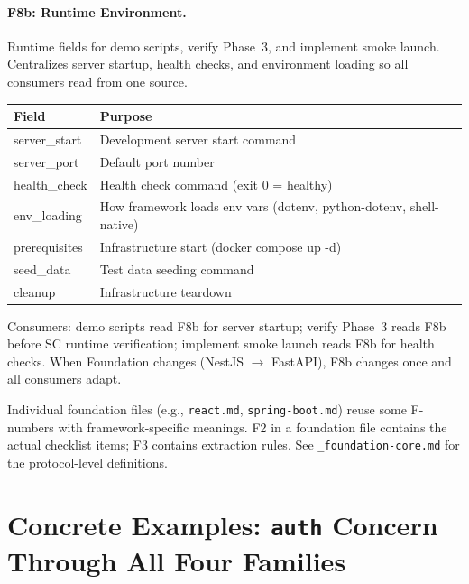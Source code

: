 \documentclass[11pt,a4paper,openright,twoside]{report}
\begin{document}
\paragraph{F8b: Runtime Environment.}
Runtime fields for demo scripts, verify Phase~3, and implement smoke launch. Centralizes server startup, health checks, and environment loading so all consumers read from one source.

\begin{table}[H]
\centering
\begin{tabularx}{\textwidth}{lX}
\toprule
\textbf{Field} & \textbf{Purpose} \\
\midrule
server\_start & Development server start command \\
server\_port & Default port number \\
health\_check & Health check command (exit 0 = healthy) \\
env\_loading & How framework loads env vars (dotenv, python-dotenv, shell-native) \\
prerequisites & Infrastructure start (docker compose up -d) \\
seed\_data & Test data seeding command \\
cleanup & Infrastructure teardown \\
\bottomrule
\end{tabularx}
\end{table}

Consumers: demo scripts read F8b for server startup; verify Phase~3 reads F8b before SC runtime verification; implement smoke launch reads F8b for health checks. When Foundation changes (NestJS $\rightarrow$ FastAPI), F8b changes once and all consumers adapt.

\begin{notebox}
Individual foundation files (e.g., \texttt{react.md}, \texttt{spring-boot.md}) reuse some F-numbers with framework-specific meanings. F2 in a foundation file contains the actual checklist items; F3 contains extraction rules. See \texttt{\_foundation-core.md} for the protocol-level definitions.
\end{notebox}


\section{Concrete Examples: \texttt{auth} Concern Through All Four Families}
\label{sec:auth-example}
\end{document}
